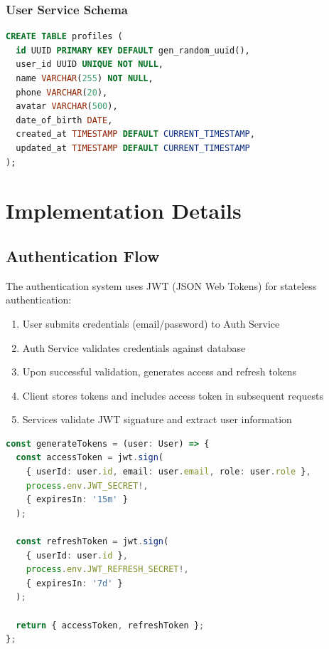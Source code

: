 \documentclass[12pt,a4paper]{article}
\begin{document}
\subsubsection{User Service Schema}
\begin{lstlisting}[language=SQL, caption=Profiles Table]
CREATE TABLE profiles (
  id UUID PRIMARY KEY DEFAULT gen_random_uuid(),
  user_id UUID UNIQUE NOT NULL,
  name VARCHAR(255) NOT NULL,
  phone VARCHAR(20),
  avatar VARCHAR(500),
  date_of_birth DATE,
  created_at TIMESTAMP DEFAULT CURRENT_TIMESTAMP,
  updated_at TIMESTAMP DEFAULT CURRENT_TIMESTAMP
);
\end{lstlisting}

\section{Implementation Details}

\subsection{Authentication Flow}

The authentication system uses JWT (JSON Web Tokens) for stateless authentication:

\begin{enumerate}
    \item User submits credentials (email/password) to Auth Service
    \item Auth Service validates credentials against database
    \item Upon successful validation, generates access and refresh tokens
    \item Client stores tokens and includes access token in subsequent requests
    \item Services validate JWT signature and extract user information
\end{enumerate}

\begin{lstlisting}[language=TypeScript, caption=JWT Token Generation]
const generateTokens = (user: User) => {
  const accessToken = jwt.sign(
    { userId: user.id, email: user.email, role: user.role },
    process.env.JWT_SECRET!,
    { expiresIn: '15m' }
  );
  
  const refreshToken = jwt.sign(
    { userId: user.id },
    process.env.JWT_REFRESH_SECRET!,
    { expiresIn: '7d' }
  );
  
  return { accessToken, refreshToken };
};
\end{lstlisting}
\end{document}
